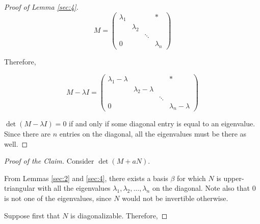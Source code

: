 \documentclass[11pt]{scrartcl}
\begin{document}
\begin{linenumbers}
\begin{proof}[Proof of Lemma \ref{sec:4}]
    \begin{equation*}
      M=
      \begin{pmatrix}
        \lambda_1 &             &        & * \\
                  & \lambda_{2} &        &   \\
                  &             & \ddots &   \\
        0         &             &        & \lambda_{n}
      \end{pmatrix}
    \end{equation*}

    Therefore,


    \begin{equation*}
      M - \lambda I =       \begin{pmatrix}
        \lambda_1 - \lambda &                       &        & * \\
                            & \lambda_{2} - \lambda &        &   \\
                            &                       & \ddots &   \\
        0                   &                       &        & \lambda_{n}-\lambda
      \end{pmatrix}
    \end{equation*}


    $\det(M - \lambda I) = 0$ if and only if some diagonal entry is
    equal to an eigenvalue. Since there are $n$ entries on the
    diagonal, all the eigenvalues must be there as well.
  \end{proof}

  \begin{proof}[Proof of the Claim]
    Consider $\det(M+aN)$.

    From Lemmas \ref{sec:2} and \ref{sec:4}, there exists a basis
    $\beta$ for which $N$ is upper-triangular with all the eigenvalues
    $\lambda_1, \lambda_2, \dots, \lambda_{n}$ on the diagonal. Note
    also that $0$ is not one of the eigenvalues, since $N$ would not
    be invertible otherwise.

    Suppose first that $N$ is diagonalizable. Therefore,


\end{proof}
\end{linenumbers}
\end{document}
